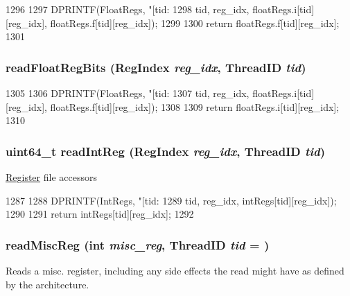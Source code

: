 \begin{DoxyCode}
1296 {
1297     DPRINTF(FloatRegs, "[tid:%
1298             tid, reg_idx, floatRegs.i[tid][reg_idx], floatRegs.f[tid][reg_idx]);
1299 
1300     return floatRegs.f[tid][reg_idx];
1301 }
\end{DoxyCode}
\hypertarget{classInOrderCPU_a29376f1c5a0787ea5f829651454f9205}{
\subsubsection[{readFloatRegBits}]{ readFloatRegBits ({\bf RegIndex} {\em reg\_\-idx}, \/  {\bf ThreadID} {\em tid})}}
\label{classInOrderCPU_a29376f1c5a0787ea5f829651454f9205}



\begin{DoxyCode}
1305 {
1306     DPRINTF(FloatRegs, "[tid:%
1307             tid, reg_idx, floatRegs.i[tid][reg_idx], floatRegs.f[tid][reg_idx]);
1308 
1309     return floatRegs.i[tid][reg_idx];
1310 }
\end{DoxyCode}
\hypertarget{classInOrderCPU_a01d90b889dc598239bda63243ef365cf}{
\subsubsection[{readIntReg}]{\setlength{\rightskip}{0pt plus 5cm}uint64\_\-t readIntReg ({\bf RegIndex} {\em reg\_\-idx}, \/  {\bf ThreadID} {\em tid})}}
\label{classInOrderCPU_a01d90b889dc598239bda63243ef365cf}
\hyperlink{classRegister}{Register} file accessors 


\begin{DoxyCode}
1287 {
1288     DPRINTF(IntRegs, "[tid:%
1289             tid, reg_idx, intRegs[tid][reg_idx]);
1290 
1291     return intRegs[tid][reg_idx];
1292 }
\end{DoxyCode}
\hypertarget{classInOrderCPU_a71d44ee14eeab530a09bc7d68d97ece2}{
\subsubsection[{readMiscReg}]{ readMiscReg (int {\em misc\_\-reg}, \/  {\bf ThreadID} {\em tid} = {})}}
\label{classInOrderCPU_a71d44ee14eeab530a09bc7d68d97ece2}
Reads a misc. register, including any side effects the read might have as defined by the architecture. 


